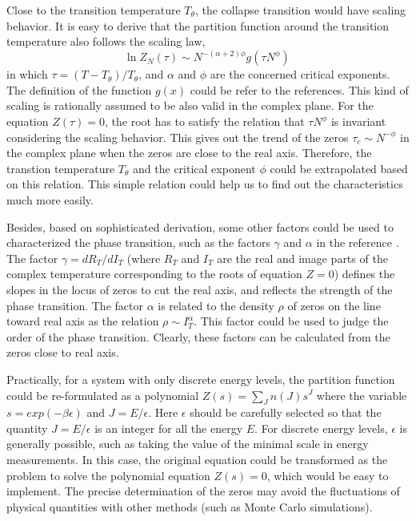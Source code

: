 \documentclass[preprint,preprintnumbers,amsmath,amssymb,showpacs,aps,pre]{revtex4-1}
\begin{document}
Close to the transition temperature $T_{\theta}$, the collapse transition would
have scaling behavior. It is easy to derive that the partition function around
the transition temperature also follows the scaling law,
\begin{equation}
\ln Z_N(\tau) \sim N^{-(\alpha+2)\phi} g(\tau N^{\phi}) \,
\end{equation}
in which $\tau=(T-T_{\theta})/T_{\theta}$, and $\alpha$ and $\phi$ are the
concerned critical exponents. The definition of the function $g(x)$ could be
refer to the references. This kind of scaling is rationally assumed to be also
valid in the complex plane. For the equation $Z(\tau)=0$, the root has to
satisfy the relation that $\tau N^{\phi}$ is invariant considering the scaling
behavior. This gives out the trend of the zeros $\tau_c \sim N^{-\phi}$ in the
complex plane when the zeros are close to the real axis. Therefore, the
transtion temperature $T_{\theta}$ and the critical exponent $\phi$ could be
extrapolated based on this relation. This simple relation could help us to find
out the characteristics much more easily.

Besides, based on sophisticated derivation, some other factors could be used
to characterized the phase transition, such as the factors $\gamma$ and
$\alpha$ in the reference \cite{Adermann2004}. The factor $\gamma=d R_T/d I_T$
(where $R_T$ and $I_T$ are the real and image parts of the complex temperature
corresponding to the roots of equation $Z=0$) defines the slopes in the locus
of zeros to cut the real axis, and reflects the strength of the phase
transition. The factor $\alpha$ is related to the density $\rho$ of zeros on the line
toward real axis as the relation $\rho \sim I_T^{\alpha}$. This factor could
be used to judge the order of the phase transition. Clearly, these factors can
be calculated from the zeros close to real axis.

Practically, for a system with only discrete energy levels, the partition
function could be
re-formulated as a polynomial $Z(s)=\sum_J n(J) s^J$ where the variable
$s=exp(-\beta\epsilon)$ and $J=E/\epsilon$. Here $\epsilon$ should be carefully
selected so that the quantity $J=E/\epsilon$ is an integer for all the energy
$E$. For discrete energy levels, $\epsilon$ is generally possible, such as
taking the value of the minimal scale in energy measurements. In this case, the
original equation could be transformed as the problem to solve the polynomial
equation $Z(s)=0$, which would be easy to implement. The precise determination
of the zeros may avoid the fluctuations of physical quantities with other
methods (such as Monte Carlo simulations).
\end{document}
